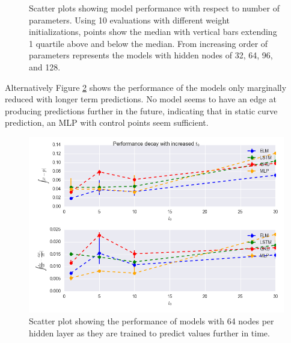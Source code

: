 \documentclass[11pt]{article}
\begin{document}
\begin{figure}
\begin{center}
    \caption{Scatter plots showing model performance with respect to
      number of parameters. Using 10 evaluations with different weight
    initializations, points show the median with vertical bars
    extending 1 quartile above and below the median. From increasing
    order of parameters
    represents the models with hidden nodes of 32, 64, 96, and 128.}
    \label{fig:mg1_scatter}
    \end{center}
  \end{figure}

Alternatively Figure \ref{fig:mg1_save} shows the performance of the models only
marginally reduced with longer term predictions. No model seems to
have an edge at producing predictions further in the future,
indicating that in static curve prediction, an MLP with control points
seem sufficient.

  \begin{figure}
    \begin{center}
   \includegraphics[width=.96\textwidth]{figures/mg1_save.png}
       
    \caption{Scatter plot showing the performance of models with 64 nodes
      per hidden layer as they are trained to predict values further
      in time.}
    \label{fig:mg1_save}
    \end{center}
  \end{figure}
\end{document}
